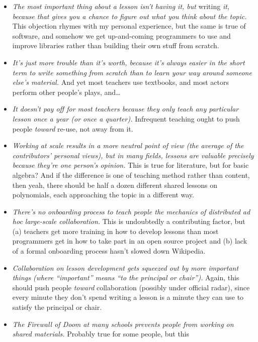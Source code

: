 \documentclass[10pt,statementpaper]{memoir}
\begin{document}
\begin{itemize}
\item
  \emph{The most important thing about a lesson isn't having it, but
  }writing\emph{ it, because that gives you a chance to figure out what
  you think about the topic.} This objection rhymes with my personal
  experience, but the same is true of software, and somehow we get
  up-and-coming programmers to use and improve libraries rather than
  building their own stuff from scratch.
\item
  \emph{It's just more trouble than it's worth, because it's always
  easier in the short term to write something from scratch than to learn
  your way around someone else's material.} And yet most teachers use
  textbooks, and most actors perform other people's plays, and\ldots{}
\item
  \emph{It doesn't pay off for most teachers because they only teach any
  particular lesson once a year (or once a quarter).} Infrequent
  teaching ought to push people \emph{toward} re-use, not away from it.
\item
  \emph{Working at scale results in a more neutral point of view (the
  average of the contributors' personal views), but in many fields,
  lessons are valuable precisely because they're one person's opinion.}
  This is true for literature, but for basic algebra? And if the
  difference is one of teaching method rather than content, then yeah,
  there should be half a dozen different shared lessons on polynomials,
  each approaching the topic in a different way.
\item
  \emph{There's no onboarding process to teach people the mechanics of
  distributed ad hoc large-scale collaboration.} This is undoubtedly a
  contributing factor, but (a) teachers get more training in how to
  develop lessons than most programmers get in how to take part in an
  open source project and (b) lack of a formal onboarding process hasn't
  slowed down Wikipedia.
\item
  \emph{Collaboration on lesson development gets squeezed out by more
  important things (where ``important'' means ``to the principal or
  chair'').} Again, this should push people \emph{toward} collaboration
  (possibly under official radar), since every minute they don't spend
  writing a lesson is a minute they can use to satisfy the principal or
  chair.
\item
  \emph{The Firewall of Doom at many schools prevents people from
  working on shared materials.} Probably true for some people, but this

\end{itemize}
\end{document}
